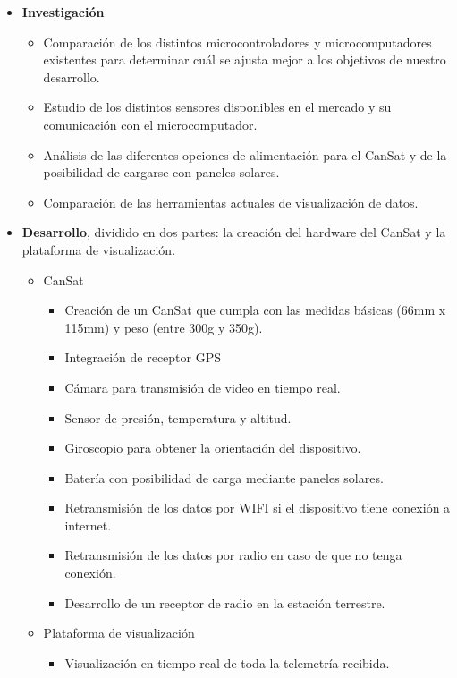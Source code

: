 \begin{itemize}
    \item \textbf{Investigación}
    \begin{itemize}
        \item Comparación de los distintos microcontroladores y microcomputadores existentes para determinar cuál se ajusta mejor a los objetivos de nuestro desarrollo.
        \item Estudio de los distintos sensores disponibles en el mercado y su comunicación con el microcomputador.
        \item Análisis de las diferentes opciones de alimentación para el CanSat y de la posibilidad de cargarse con paneles solares.
        \item Comparación de las herramientas actuales de visualización de datos.
    \end{itemize}
    \item \textbf{Desarrollo}, dividido en dos partes: la creación del hardware del CanSat y la plataforma de visualización.
    \begin{itemize}
        \item CanSat
        \begin{itemize}
            \item Creación de un CanSat que cumpla con las medidas básicas (66mm x 115mm) y peso (entre 300g y 350g).
            \item Integración de receptor GPS
            \item Cámara para transmisión de video en tiempo real.
            \item Sensor de presión, temperatura y altitud.
            \item Giroscopio para obtener la orientación del dispositivo.
            \item Batería con posibilidad de carga mediante paneles solares.
            \item Retransmisión de los datos por WIFI si el dispositivo tiene conexión a internet.
            \item Retransmisión de los datos por radio en caso de que no tenga conexión.
            \item Desarrollo de un receptor de radio en la estación terrestre.
        \end{itemize}
        \item Plataforma de visualización
        \begin{itemize}
            \item Visualización en tiempo real de toda la telemetría recibida.

\end{itemize}
\end{itemize}
\end{itemize}
